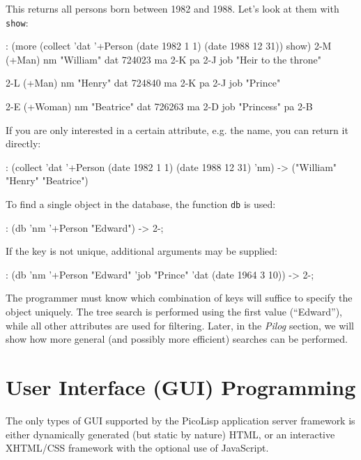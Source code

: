 This returns all persons born between 1982 and 1988. Let's look at them
with \texttt{show}:


\begin{wideverbatim}
: (more (collect 'dat '+Person (date 1982 1 1) (date 1988 12 31)) show)
{2-M} (+Man)
   nm "William"
   dat 724023
   ma {2-K}
   pa {2-J}
   job "Heir to the throne"

{2-L} (+Man)
   nm "Henry"
   dat 724840
   ma {2-K}
   pa {2-J}
   job "Prince"

{2-E} (+Woman)
   nm "Beatrice"
   dat 726263
   ma {2-D}
   job "Princess"
   pa {2-B}
\end{wideverbatim}

If you are only interested in a certain attribute, e.g. the name, you
can return it directly:


\begin{wideverbatim}
: (collect 'dat '+Person (date 1982 1 1) (date 1988 12 31) 'nm)
-> ("William" "Henry" "Beatrice")
\end{wideverbatim}

To find a single object in the database, the function \texttt{db} is used:


\begin{wideverbatim}
: (db 'nm '+Person "Edward")
-> {2-;}
\end{wideverbatim}

If the key is not unique, additional arguments may be supplied:


\begin{wideverbatim}
: (db 'nm '+Person "Edward"  'job "Prince"  'dat (date 1964 3 10))
-> {2-;}
\end{wideverbatim}

The programmer must know which combination of keys will suffice to
specify the object uniquely. The tree search is performed using the
first value (``Edward''), while all other attributes are used for
filtering. Later, in the \emph{Pilog} section, we will show how
more general (and possibly more efficient) searches can be performed.

 
\section{User Interface (GUI) Programming}
\label{sec:tut-user-interface-(gui)-programming}


The only types of GUI supported by the PicoLisp application server
framework is either dynamically generated (but static by nature) HTML,
or an interactive XHTML/CSS framework with the optional use of
JavaScript.

